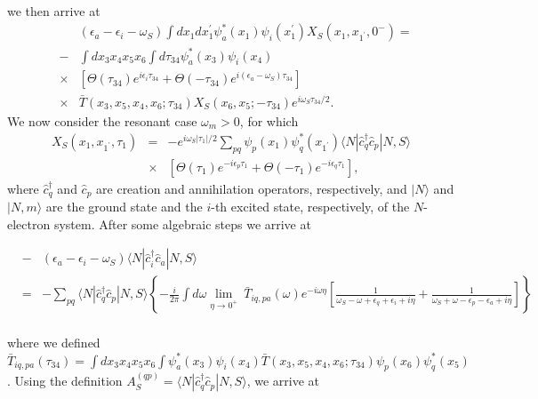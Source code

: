 \documentclass[a4paper,superscriptaddress,twocolumn,aps,prb,floatfix,citeautoscript]{revtex4-1}\usepackage[utf8]{inputenc}
\begin{document}
we then arrive at
 \begin{eqnarray}
&&(\epsilon_a-\epsilon_i-\omega_S)\int dx_1dx^{\prime}_1 \psi^*_a(x_1)\psi_i(x_1^\prime)  X_S(x_1,x_{1^\prime},0^-)=\nonumber\\
  &-&\int dx_3x_4x_5x_6\int d\tau_{34}\psi_a^*(x_3)\psi_i(x_4)\nonumber\\
  &\times&\left[\Theta(\tau_{34})e^{i\epsilon_{i}\tau_{34}}+\Theta(-\tau_{34})e^{i(\epsilon_{a}-\omega_S)\tau_{34}}\right]\nonumber\\
&\times&\bar{T}(x_3,x_5,x_4,x_6;\tau_{34})X_S(x_6,x_5;-\tau_{34})e^{i\omega_S\tau_{34}/2}.
\label{Eqn:General_DYN}
\end{eqnarray}
%
%
%
We now consider the resonant case $\omega_m>0$, for which 
\begin{eqnarray}
X_S(x_1,x_{1^\prime},\tau_1)   &=&-e^{i\omega_S|\tau_1|/2} \sum_{pq}\psi_p(x_1)\psi^*_{q}(x_{1^\prime})\langle N|\hat{c}^\dagger_{q}\hat{c}_p|N,S\rangle\nonumber\\
  &\times&\left[\Theta(\tau_1)e^{-i\epsilon_p\tau_1}+\Theta(-\tau_1)e^{-i\epsilon_{q}\tau_1}\right],
  \label{Eqn:chi_tau}
  \end{eqnarray}
  where $\hat{c}^\dagger_{q}$ and $\hat{c}_p$ are creation and annihilation operators, respectively, and $|N\rangle$ and $|N,m\rangle$ are the ground state and the $i$-th excited state, respectively, of the $N$-electron system.
After some algebraic steps we arrive at 
\begin{widetext}
 \begin{eqnarray}
&-&(\epsilon_a-\epsilon_i-\omega_S)\langle N|\hat{c}^\dagger_{i}\hat{c}_a|N,S\rangle\nonumber\\
    &=& -\sum_{pq}\langle N|\hat{c}^\dagger_{q}\hat{c}_p|N,S\rangle\left\{-\frac{i}{2\pi}\int d\omega \lim_{\eta\rightarrow 0^+}\ \bar{T}_{iq,pa}(\omega) e^{-i\omega\eta}\left[\frac{1}{\omega_S-\omega+\epsilon_{q}+\epsilon_i+i\eta}+\frac{1}{\omega_S+\omega-\epsilon_p-\epsilon_a+i\eta}\right]\right\}\nonumber\\
  \end{eqnarray}
\end{widetext}
where we defined $ \bar{T}_{iq,pa}(\tau_{34})=\int dx_3x_4x_5x_6\int \psi_a^*(x_3)\psi_i(x_4)\bar{T}(x_3,x_5,x_4,x_6;\tau_{34}) \psi_p(x_6)\psi^*_{q}(x_5)$. Using the definition $A_S^{(qp)}=\langle N|\hat{c}^\dagger_{q}\hat{c}_p|N,S\rangle$, we arrive at
\end{document}
